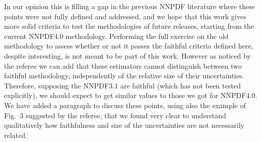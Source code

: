 \documentclass[11pt,a4paper]{article}
\numberwithin{equation}{section}
\numberwithin{figure}{section}
\numberwithin{table}{section}
\begin{document}
\begin{enumerate}
    In our opinion this is filling a gap in the previous NNPDF literature where these points 
    were not fully defined and addressed, and we hope that this work gives more solid criteria 
    to test the methodologies of future releases, starting from the current NNPDF4.0 methodology.
    Performing the full exercise on the old methodology to assess whether or not it passes the faithful
    criteria defined here, despite interesting, is not meant to be part of this work.
    However as noticed by the referee we can add that these estimators cannot distinguish 
    between two faithful methodology, independently of the relative size of their uncertainties.
    Therefore, supposing the NNPDF3.1 are faithful (which has not been tested explicitly),
    we should expect to get similar values to those we got for NNPDF4.0.
    We have added a paragraph to discuss these points, using also the example of Fig.~3 suggested by the referee,
    that we found very clear to understand qualitatively how faithfulness and size of the uncertainties are 
    not necessarily related. 



\end{enumerate}
\end{document}
